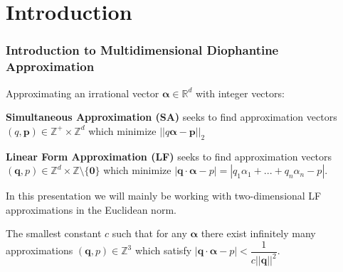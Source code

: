 \documentclass[aspectratio=1610]{beamer}
\begin{document}
\section{Introduction}
\begin{frame}
    \frametitle{Introduction to Multidimensional Diophantine Approximation}
    
    Approximating an irrational vector $\boldsymbol{\alpha} \in \mathbb{R}^d$ with integer vectors:

    \textbf{Simultaneous Approximation (SA)}
    seeks to find approximation vectors $(q,\mathbf{p}) \in \mathbb{Z}^+ \times \mathbb{Z}^d$ which minimize $ || q\boldsymbol{\alpha} - \mathbf{p} ||_2$

    \textbf{Linear Form Approximation (LF)}
    seeks to find approximation vectors $(\mathbf{q},p) \in \mathbb{Z}^d \times \mathbb{Z} \setminus \{\textbf{0}\}$ which minimize
    $| \mathbf{q} \cdot \boldsymbol{\alpha} - p | = |q_1\alpha_1 + ... + q_n\alpha_n - p|$.

    In this presentation we will mainly be working with two-dimensional LF approximations in the Euclidean norm.
    
    \begin{definition}
        The smallest constant $c$ such that for any $\boldsymbol{\alpha}$ there exist infinitely many approximations $(\mathbf{q},p) \in \mathbb{Z}^3$
        which satisfy $| \mathbf{q} \cdot \boldsymbol{\alpha} - p | < \dfrac{1}{c||\textbf{q}||^2}$.
    \end{definition}

\end{frame}
\end{document}
